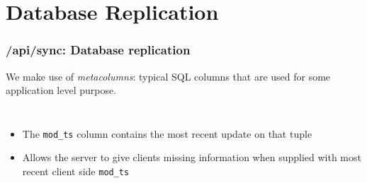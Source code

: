 \documentclass[]{beamer}
\newcommand{\pad}{\vbox to 20pt{}}
\begin{document}
\section{Database Replication}

\begin{frame}
\frametitle{/api/sync: Database replication}
We make use of \textit{metacolumns}: typical SQL columns that are used for some application level purpose.

\begin{columns}[c]
\column{2in}
\column{2in}
\small
\begin{itemize}
\item The \texttt{mod\_ts} column contains the most recent update on that tuple
\item Allows the server to give clients missing information when supplied with most recent client side \texttt{mod\_ts}
\end{itemize}
\end{columns}
\end{frame}









%
%
%
%
%
%
%
\end{document}
